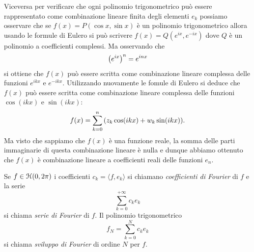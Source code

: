 Viceversa per verificare che ogni polinomio trigonometrico può essere rappresentato
come combinazione lineare finita degli elementi $e_k$
possiamo osservare che se $f(x) = P(\cos x,\sin x)$ è un polinomio trigonometrico
allora usando le formule di Eulero si può scrivere $f(x) = Q(e^{ix}, e^{-ix})$
dove $Q$ è un polinomio a coefficienti complessi. Ma osservando che
\[
  {\left( e^{ix} \right)}^n = e^{inx}
\]
si ottiene che $f(x)$ può essere scritta come combinazione lineare complessa
delle funzioni $e^{ikx}$ e $e^{-ikx}$. Utilizzando nuovamente le fomule di
Eulero si deduce che $f(x)$ può essere scritta come combinazione lineare
complessa delle funzioni $\cos(ikx)$ e $\sin(ikx)$:
\[
  f(x) = \sum_{k=0}^n {\left( z_k \cos(ikx) + w_k \sin(ikx) \right)}.
\]
Ma visto che sappiamo che $f(x)$ è una funzione reale, la somma delle parti
immaginarie di questa combinazione lineare è nulla e dunque abbiamo ottenuto
che $f(x)$ è combinazione lineare a coefficienti reali
delle funzioni $e_n$.

\begin{definition}
Se $f\in \mathcal H(0,2\pi)$ i coefficienti $c_k = \langle f, e_k\rangle$
si chiamano \emph{coefficienti di Fourier}%
 di $f$
e la serie
\[
  \sum_{k=0}^{+\infty} c_k e_k
\]
si chiama \emph{serie di Fourier}%
 di $f$.
Il polinomio trigonometrico
\[
  f_N = \sum_{k=0}^{N} c_k e_k
\]
si chiama \emph{sviluppo di Fourier}%
 di ordine $N$ per $f$.
\end{definition}

